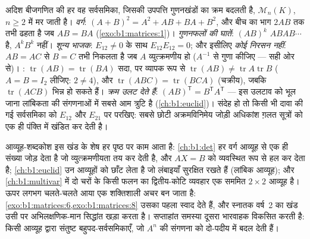 \begin{remark}
\label{rem:b1:matrices:pitfalls}
अदिश बीजगणित की हर वह सर्वसमिका, जिसकी उपपत्ति गुणनखंडों का क्रम बदलती है,
$\mathcal{M}_n(K)$, $n \geq 2$ में मर जाती है। \emph{वर्ग}: $(A + B)^2 = A^2
+ AB + BA + B^2$, और बीच का भाग $2AB$ तक तभी ढहता है जब $AB = BA$
(\cref{exo:b1:matrices:1})। \emph{गुणनफलों की घातें}: $(AB)^k$ $ABAB\cdots$
है, $A^kB^k$ नहीं। \emph{शून्य भाजक}: $E_{12} \neq 0$ के साथ $E_{12}E_{12} =
0$; और इसीलिए \emph{कोई निरसन नहीं}: $AB = AC$ से $B = C$ तभी निकलता है जब
$A$ व्युत्क्रमणीय हो ($A^{-1}$ से गुणा कीजिए --- सही ओर से)। \emph{}:
$\operatorname{tr}(AB) = \operatorname{tr}(BA)$ सदा, पर व्यापक रूप से
$\operatorname{tr}(AB) \neq \operatorname{tr}A\operatorname{tr}B$ ($A = B =
I_2$ लीजिए: $2 \neq 4$), और $\operatorname{tr}(ABC) =
\operatorname{tr}(BCA)$ (चक्रीय), जबकि $\operatorname{tr}(ACB)$ भिन्न हो
सकते हैं। \emph{ क्रम उलट देते हैं}: $(AB)^{\mathsf T} = B^{\mathsf
T}A^{\mathsf T}$ --- इस उलटाव को भूल जाना लांबिकता की संगणनाओं में सबसे आम
त्रुटि है (\cref{ch:b1:euclid})। संदेह हो तो किसी भी दावा की गई सर्वसमिका को
$E_{12}$ और $E_{21}$ पर परखिए: सबसे छोटी अक्रमविनिमेय जोड़ी अधिकांश ग़लत
सूत्रों को एक ही पंक्ति में खंडित कर देती है।
\end{remark}

\begin{remark}[यह शब्दकोश कहाँ जाता है]
\label{rem:b1:matrices:whereused}
आव्यूह-शब्दकोश इस खंड के शेष हर पृष्ठ पर काम आता है: \cref{ch:b1:det} हर
वर्ग आव्यूह से एक ही संख्या जोड़ देता है जो व्युत्क्रमणीयता तय कर देती है,
और $AX = B$ को व्यवस्थित रूप से हल कर देता है; \cref{ch:b1:euclid} उन
आव्यूहों को छाँट लेता है जो लंबाइयाँ सुरक्षित रखते हैं (लांबिक आव्यूह); और
\cref{ch:b1:multivar} में दो चरों के किसी फलन का द्वितीय-कोटि व्यवहार एक
सममित $2 \times 2$ आव्यूह है। ऊपर लगभग चलते-चलते आया  एक शक्तिशाली अचर
बन जाता है: \cref{exo:b1:matrices:6,exo:b1:matrices:8} उसका पहला स्वाद देते
हैं, और स्नातक वर्ष~2 का खंड उसी पर अभिलक्षणिक-मान सिद्धांत खड़ा करता है।
सप्ताहांत समस्या दूसरा भारवाहक विकसित करती है: किसी आव्यूह द्वारा संतुष्ट
बहुपद-सर्वसमिकाएँ, जो $A^n$ की संगणना को दो-पदीय  में बदल
देती हैं।
\end{remark}


